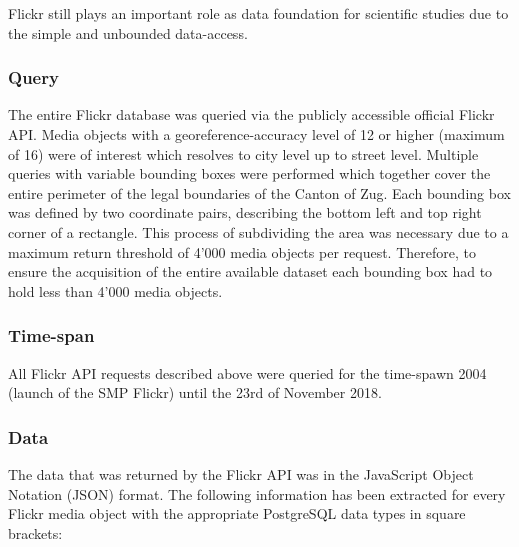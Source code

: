 Flickr still plays an important role as data foundation for scientific studies due to the simple and unbounded data-access. 
\subsubsection*{Query} \label{flickr_query}
The entire Flickr database was queried via the publicly accessible official Flickr API. Media objects with a georeference-accuracy level of 12 or higher (maximum of 16) were of interest which resolves to city level up to street level. Multiple queries with variable bounding boxes were performed which together cover the entire perimeter of the legal boundaries of the Canton of Zug. Each bounding box was defined by two coordinate pairs, describing the bottom left and top right corner of a rectangle. This process of subdividing the area was necessary due to a maximum return threshold of 4'000 media objects per request. Therefore, to ensure the acquisition of the entire available dataset each bounding box had to hold less than 4'000 media objects.

\subsubsection*{Time-span} \label{flickr_timespan}
All Flickr API requests described above were queried for the time-spawn 2004 (launch of the SMP Flickr) until the 23rd of November 2018.

\subsubsection*{Data} \label{flickr_data}
The data that was returned by the Flickr API was in the JavaScript Object Notation (JSON) format. The following information has been extracted for every Flickr media object with the appropriate PostgreSQL data types in square brackets:\\

